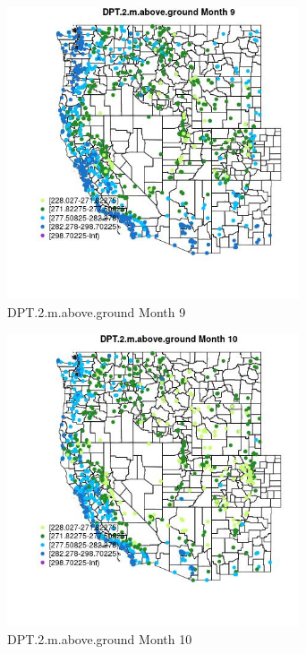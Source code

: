 \begin{figure} 
\centering  
\includegraphics[width=0.77\textwidth]{Code_Outputs/Report_ML_input_PM25_Step4_part_f_de_duplicated_aves_prioritize_24hr_obswNAs_MapObsMo9DPT2maboveground.jpg} 
\caption{\label{fig:Report_ML_input_PM25_Step4_part_f_de_duplicated_aves_prioritize_24hr_obswNAsMapObsMo9DPT2maboveground}DPT.2.m.above.ground Month 9} 
\end{figure} 
 

\begin{figure} 
\centering  
\includegraphics[width=0.77\textwidth]{Code_Outputs/Report_ML_input_PM25_Step4_part_f_de_duplicated_aves_prioritize_24hr_obswNAs_MapObsMo10DPT2maboveground.jpg} 
\caption{\label{fig:Report_ML_input_PM25_Step4_part_f_de_duplicated_aves_prioritize_24hr_obswNAsMapObsMo10DPT2maboveground}DPT.2.m.above.ground Month 10} 
\end{figure} 
 

